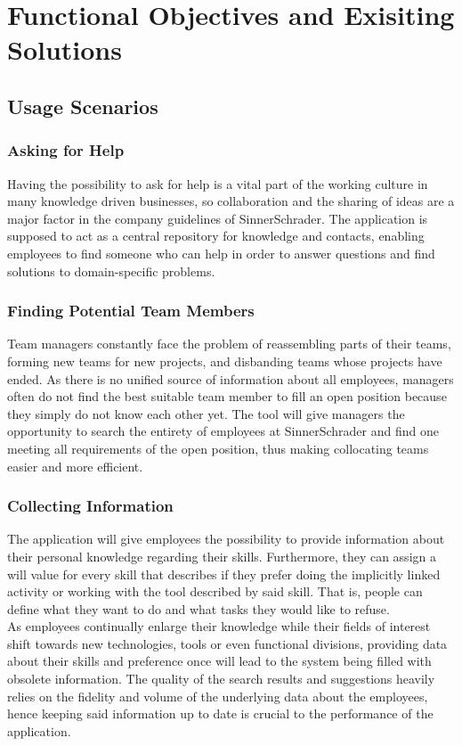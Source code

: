 \chapter{Functional Objectives and Exisiting Solutions}

\section{Usage Scenarios}
\subsection{Asking for Help}
Having the possibility to ask for help is a vital part of the working culture in many knowledge driven
businesses, so collaboration and the sharing of ideas are a major factor in the company guidelines
of SinnerSchrader. The application is supposed to act as a central repository for knowledge and contacts,
enabling employees to find someone who can help in order to answer questions and find solutions to domain-specific problems.

\subsection{Finding Potential Team Members}
Team managers constantly face the problem of reassembling parts of their teams, forming new teams for new projects, and
disbanding teams whose projects have ended. As there is no unified source of information about all employees, managers often
do not find the best suitable team member to fill an open position because they simply do not know each other yet.
The tool will give managers the opportunity to search the entirety of employees at SinnerSchrader and find one
meeting all requirements of the open position, thus making collocating teams easier and more efficient.

\subsection{Collecting Information}
The application will give employees the possibility to provide information about their personal knowledge regarding their skills.
Furthermore, they can assign a will value for every skill that describes if they prefer
doing the implicitly linked activity or working with the tool described by said skill. That is, people can define what they want to do and what tasks they would like to refuse.\\
As employees continually enlarge their knowledge while their fields of interest shift towards new technologies, tools or even
functional divisions, providing data about their skills and preference once will lead to the system being filled with obsolete
information. The quality of the search results and suggestions heavily relies on the fidelity and volume of the underlying data about the employees, hence keeping said information up to date is crucial to the performance of the application.

